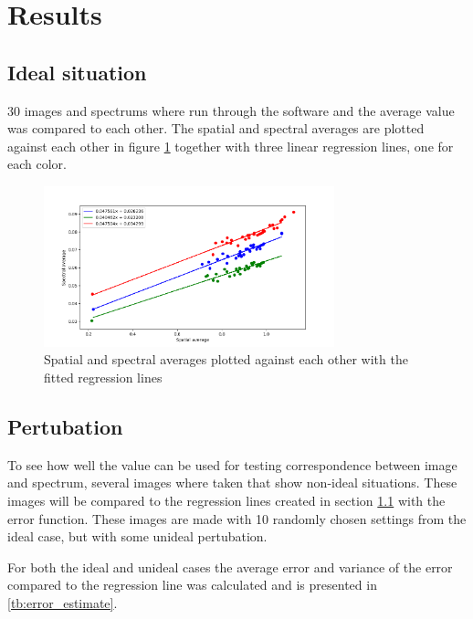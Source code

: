 \section{Results}

\subsection{Ideal situation}
\label{sec:ideal_situation}
30 images and spectrums where run through the software and the average value was compared to each other. The spatial and spectral averages are plotted against each other in figure \ref{fig:spectral_vs_spatial_values} together with three linear regression lines, one for each color. 


\begin{figure}[h]
    \centering
    \includegraphics[width=0.75\textwidth]{Plots/spectral_vs_spatial_average_with_regression.png}
    \caption{Spatial and spectral averages plotted against each other with the fitted regression lines}
    \label{fig:spectral_vs_spatial_values}
\end{figure}

\subsection{Pertubation}
To see how well the value can be used for testing correspondence between image and spectrum, several images where taken that show non-ideal situations. These images will be compared to the regression lines created in section \ref{sec:ideal_situation} with the error function. These images are made with 10 randomly chosen settings from the ideal case, but with some unideal pertubation. 

For both the ideal and unideal cases the average error and variance of the error compared to the regression line was calculated and is presented in \ref{tb:error_estimate}.

